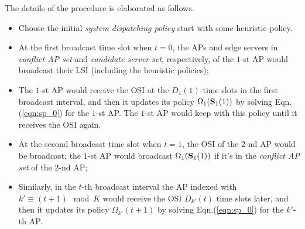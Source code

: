 The details of the procedure is elaborated as follows.
\begin{itemize}
    \item Choose the initial \emph{system dispatching policy} start with some heuristic policy.
    \item At the first broadcast time slot when $t=0$, the APs and edge servers in \emph{conflict AP set} and \emph{candidate server set}, respectively, of the $1$-st AP would broadcast their LSI (including the heuristic policies);
    \item The $1$-st AP would receive the OSI at the $D_1(1)$ time slots in the first broadcast interval, and then it updates its policy $\Omega_{1}(\mathbf{S}_{1}(1))$ by solving Eqn.(\ref{eqn:sp_0}) for the $1$-st AP.
    The $1$-st AP would keep with this policy until it receives the OSI again.
    \item At the second broadcast time slot when $t=1$, the OSI of the $2$-nd AP would be broadcast;
    the $1$-st AP would broadcast $\Omega_{1}(\mathbf{S}_{1}(1))$ if it's in the \emph{conflict AP set} of the $2$-nd AP;
    \item Similarly, in the $t$-th broadcast interval the AP indexed with $k' \equiv (t + 1)\mod{K}$ would receive the OSI $D_{k'}(t)$ time slots later, and then it updates its policy $\Omega_{k'}(t+1)$ by solving Eqn.(\ref{eqn:sp_0}) for the $k'$-th AP.
\end{itemize}

    

